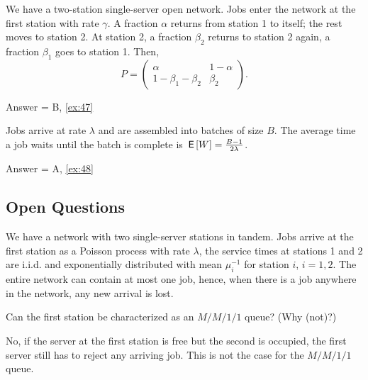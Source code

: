 \begin{exercise}[201904, 1]
  We have a two-station single-server open network.
  Jobs enter the network at the first station with rate $\gamma$.
  A fraction $\alpha$ returns from station 1 to itself; the rest moves to station 2.
  At station 2, a fraction $\beta_2$ returns to station 2 again, a fraction $\beta_1$ goes to station 1.
  Then,
  \begin{equation*}
    P = 
    \begin{pmatrix}
      \alpha & 1- \alpha \\
      1- \beta_1-\beta_2 & \beta_2
    \end{pmatrix}.
  \end{equation*}
\begin{solution}  Answer = B, \ref{ex:47}
\end{solution}
\end{exercise}

\begin{exercise}[201904, 1]
  Jobs arrive at rate $\lambda$ and are assembled into batches of size $B$.
  The average time a job waits until the batch is complete is $\,\mathsf{E}\left[W\right] = \frac{B-1}{2\lambda}$.
\begin{solution}Answer = A, \ref{ex:48}
\end{solution}
\end{exercise}

\subsection{Open Questions}

We have a network with two single-server stations in tandem.
Jobs arrive at the first station as a Poisson process with rate $\lambda$, the service times at stations 1 and 2 are i.i.d.
and exponentially distributed with mean $\mu_i^{-1}$ for station $i$, $i=1,2$.
The entire network can contain at most one job, hence, when there is a job anywhere in the network, any new arrival is lost.



\begin{exercise}[201704]
  Can the first station be characterized as an $M/M/1/1$ queue? (Why (not)?)
\begin{solution}
    No, if the server at the first station is free but the second is occupied, the first server still has to reject any arriving job. This is not the case for the $M/M/1/1$ queue.
\end{solution}
\end{exercise}


